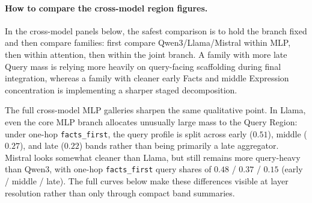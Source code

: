 \paragraph{How to compare the cross-model region figures.}
In the cross-model panels below, the safest comparison is to hold the branch fixed and then compare families: first compare Qwen3/Llama/Mistral within MLP, then within attention, then within the joint branch. A family with more late Query mass is relying more heavily on query-facing scaffolding during final integration, whereas a family with cleaner early Facts and middle Expression concentration is implementing a sharper staged decomposition.

The full cross-model MLP galleries sharpen the same qualitative point. In Llama, even the core MLP branch allocates unusually large mass to the Query Region: under one-hop \texttt{facts\_first}, the query profile is split across early ($0.51$), middle ($0.27$), and late ($0.22$) bands rather than being primarily a late aggregator. Mistral looks somewhat cleaner than Llama, but still remains more query-heavy than Qwen3, with one-hop \texttt{facts\_first} query shares of $0.48$ / $0.37$ / $0.15$ (early / middle / late). The full curves below make these differences visible at layer resolution rather than only through compact band summaries.

